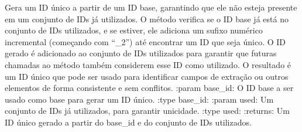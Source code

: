 \documentclass[letterpaper,10pt,english]{sphinxmanual}
\begin{document}

\begin{fulllineitems}
\label{\detokenize{api/models:models.make_unique_id}}
\pysigstartsignatures
\pysiglinewithargsret
{}
{\sphinxparamcomma {}}
{}
\pysigstopsignatures
\sphinxAtStartPar
Gera um ID único a partir de um ID base, garantindo que ele não esteja presente em um conjunto de IDs já utilizados. O método verifica se o ID base já está no conjunto de IDs utilizados, e se estiver, ele adiciona um sufixo numérico incremental (começando com “\_2”) até encontrar um ID que seja único. O ID gerado é adicionado ao conjunto de IDs utilizados para garantir que futuras chamadas ao método também considerem esse ID como utilizado. O resultado é um ID único que pode ser usado para identificar campos de extração ou outros elementos de forma consistente e sem conflitos.
:param base\_id: O ID base a ser usado como base para gerar um ID único.
:type base\_id: 
:param used: Um conjunto de IDs já utilizados, para garantir unicidade.
:type used: 
:returns: Um ID único gerado a partir do base\_id e do conjunto de IDs utilizados.
\begin{quote}\begin{description}
\sphinxAtStartPar
{}

\end{description}\end{quote}

\end{fulllineitems}

\end{document}
